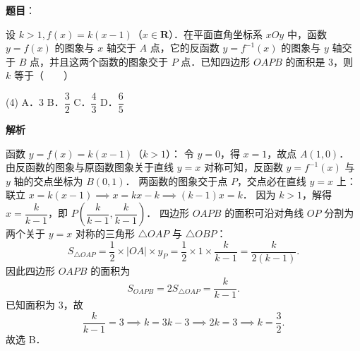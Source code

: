 \begin{answer}

\textbf{题目}：

设 $k > 1, f(x) = k(x - 1)$（$x \in \mathbf{R}$）．在平面直角坐标系 $xOy$ 中，函数 $y = f(x)$ 的图象与 $x$ 轴交于 $A$ 点，它的反函数 $y = f^{-1}(x)$ 的图象与 $y$ 轴交于 $B$ 点，并且这两个函数的图象交于 $P$ 点．已知四边形 $OAPB$ 的面积是 3，则 $k$ 等于\mbox{（　　）}

\begin{gkopts}(4)
\task A．$3$
\task B．$\dfrac{3}{2}$
\task C．$\dfrac{4}{3}$
\task D．$\dfrac{6}{5}$
\end{gkopts}

\textbf{解析}

函数 $y = f(x) = k(x - 1)$（$k > 1$）：
令 $y = 0$，得 $x = 1$，故点 $A(1, 0)$．
由反函数的图象与原函数图象关于直线 $y = x$ 对称可知，反函数 $y = f^{-1}(x)$ 与 $y$ 轴的交点坐标为 $B(0, 1)$．
两函数的图象交于点 $P$，交点必在直线 $y = x$ 上：
联立 $x = k(x - 1) \implies x = kx - k \implies (k - 1)x = k$．
因为 $k > 1$，解得 $x = \dfrac{k}{k - 1}$，即 $P\left(\dfrac{k}{k-1}, \dfrac{k}{k-1}\right)$．
四边形 $OAPB$ 的面积可沿对角线 $OP$ 分割为两个关于 $y=x$ 对称的三角形 $\triangle OAP$ 与 $\triangle OBP$：
\nopagebreak[4]
\[
S_{\triangle OAP} = \frac{1}{2} \times |OA| \times y_P = \frac{1}{2} \times 1 \times \frac{k}{k - 1} = \frac{k}{2(k - 1)}.
\]
因此四边形 $OAPB$ 的面积为
\nopagebreak[4]
\[
S_{OAPB} = 2 S_{\triangle OAP} = \frac{k}{k - 1}.
\]
已知面积为 3，故
\nopagebreak[4]
\[
\frac{k}{k - 1} = 3 \implies k = 3k - 3 \implies 2k = 3 \implies k = \frac{3}{2}.
\]
故选 B．


\end{answer}
